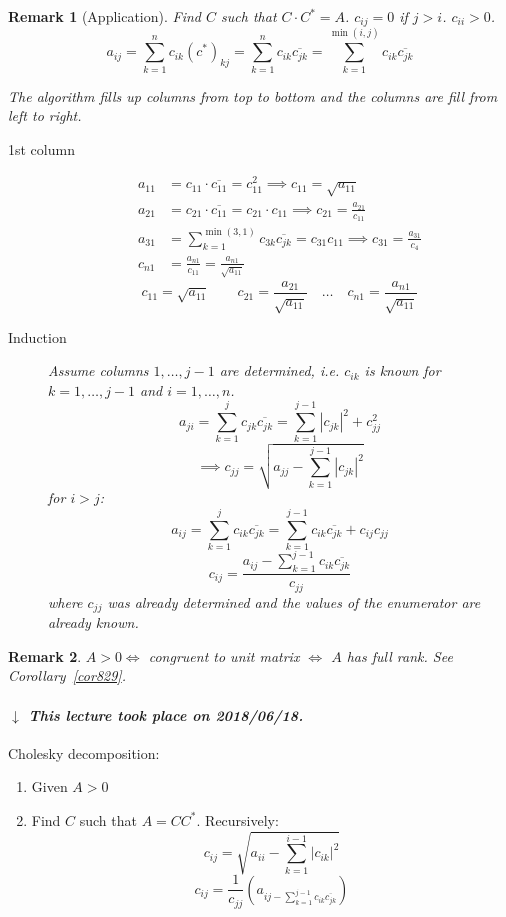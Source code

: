 \documentclass[a4paper]{article}
\numberwithin{lecref}{section}
\newtheorem*{Remark}{Remark}
\newcommand{\card}[1]{\left|#1\right|}
\newcommand{\dateref}[1]{%
  \begin{mdframed}[backgroundcolor=gray!10,innerbottommargin=0pt,innertopmargin=0pt]
    \paragraph{\textit{$\downarrow$ This lecture took place on #1.}}%
  \end{mdframed}%
}
\begin{document}
\begin{Remark}[Application]
  Find $C$ such that $C \cdot C^* = A$.
  $c_{ij} = 0$ if $j > i$.
  $c_{ii} > 0$.
  \[
    a_{ij} = \sum_{k=1}^n c_{ik} (c^*)_{kj}
      = \sum_{k=1}^n c_{ik} \overline{c_{jk}}
      = \sum_{k=1}^{\min(i,j)} c_{ik} \overline{c_{jk}}
  \]

  The algorithm fills up columns from top to bottom and the columns are fill from left to right.

  \begin{description}
    \item[1st column] 
      \begin{align*}
        a_{11} &= c_{11} \cdot \overline{c_{11}} = c_{11}^2 \implies c_{11} = \sqrt{a_{11}} \\
        a_{21} &= c_{21} \cdot \overline{c_{11}} = c_{21} \cdot c_{11} \implies c_{21} = \frac{a_{21}}{c_{11}} \\
        a_{31} &= \sum_{k=1}^{\min(3,1)} c_{3k} \overline{c_{jk}} = c_{31} c_{11} \implies c_{31} = \frac{a_{31}}{c_4} \\
        c_{n1} &= \frac{a_{n1}}{c_{11}} = \frac{a_{n1}}{\sqrt{a_{11}}}
      \end{align*}
      \[ c_{11} = \sqrt{a_{11}} \qquad c_{21} = \frac{a_{21}}{\sqrt{a_{11}}} \quad \dots \quad c_{n1} = \frac{a_{n1}}{\sqrt{a_{11}}} \]
    \item[Induction]
      Assume columns $1, \dots, j-1$ are determined, i.e. $c_{ik}$ is known for $k = 1, \dots, j-1$ and $i = 1, \dots, n$.
      \[ a_{ji} = \sum_{k=1}^j c_{jk} \overline{c_{jk}} = \sum_{k=1}^{j-1} \card{c_{jk}}^2 + c_{jj}^2 \]
      \[ \implies c_{jj} = \sqrt{a_{jj} - \sum_{k=1}^{j-1} \card{c_{jk}}^2} \]
      for $i > j$:
      \[ a_{ij} = \sum_{k=1}^j  c_{ik} \overline{c_{jk}} = \sum_{k=1}^{j-1} c_{ik} \overline{c_{jk}} + c_{ij} c_{jj} \]
      \[ c_{ij} = \frac{a_{ij} - \sum_{k=1}^{j-1} c_{ik} \overline{c_{jk}}}{c_{jj}} \]
      where $c_{jj}$ was already determined and the values of the enumerator are already known.
  \end{description}
\end{Remark}

\begin{Remark}
  $A > 0 \iff$ congruent to unit matrix $\iff$ $A$ has full rank.
  See Corollary~\ref{cor829}.
\end{Remark}

\dateref{2018/06/18}

Cholesky decomposition:
\begin{enumerate}
  \item Given $A > 0$
  \item Find $C$ such that $A = CC^*$. Recursively:
    \[ c_{ij} = \sqrt{a_{ii} - \sum_{k=1}^{i-1} \card{c_{ik}}^2} \]
    \[ c_{ij} = \frac{1}{c_{jj}} \left(a_{ij - \sum_{k=1}^{j-1} c_{ik} \overline{c_{jk}}}\right) \]
\end{enumerate}
\end{document}
